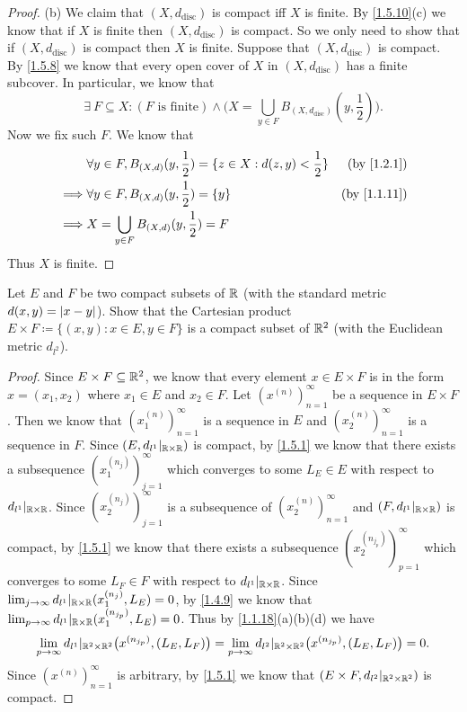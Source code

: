 \begin{proof}{(b)}
  We claim that \((X, d_{\text{disc}})\) is compact iff \(X\) is finite.
  By \cref{1.5.10}(c) we know that if \(X\) is finite then \((X, d_{\text{disc}})\) is compact.
  So we only need to show that if \((X, d_{\text{disc}})\) is compact then \(X\) is finite.
  Suppose that \((X, d_{\text{disc}})\) is compact.
  By \cref{1.5.8} we know that every open cover of \(X\) in \((X, d_{\text{disc}})\) has a finite subcover.
  In particular, we know that
  \[
    \exists\ F \subseteq X : (F \text{ is finite}) \land \bigg(X = \bigcup_{y \in F} B_{(X, d_{\text{disc}})}(y, \frac{1}{2})\bigg).
  \]
  Now we fix such \(F\).
  We know that
  \begin{align*}
             & \forall y \in F, B_{(X, d)}(y, \frac{1}{2}) = \{z \in X : d(z, y) < \frac{1}{2}\} & \text{(by \cref{1.2.1})}  \\
    \implies & \forall y \in F, B_{(X, d)}(y, \frac{1}{2}) = \{y\}                               & \text{(by \cref{1.1.11})} \\
    \implies & X = \bigcup_{y \in F} B_{(X, d)}(y, \frac{1}{2}) = F
  \end{align*}
  Thus \(X\) is finite.
\end{proof}

\begin{ex}\label{ex:1.5.13}
  Let \(E\) and \(F\) be two compact subsets of \(\mathbb{R}\) (with the standard metric \(d(x, y) = \left\lvert x - y\right\rvert\)).
  Show that the Cartesian product \(E \times F \coloneqq \{(x, y) : x \in E, y \in F\}\) is a compact subset of \(\mathbb{R}^2\) (with the Euclidean metric \(d_{l^2}\)).
\end{ex}

\begin{proof}
  Since \(E \times F \subseteq \mathbb{R}^2\), we know that every element \(x \in E \times F\) is in the form \(x = (x_1, x_2)\) where \(x_1 \in E\) and \(x_2 \in F\).
  Let \((x^{(n)})_{n = 1}^\infty\) be a sequence in \(E \times F\).
  Then we know that \((x_1^{(n)})_{n = 1}^\infty\) is a sequence in \(E\) and \((x_2^{(n)})_{n = 1}^\infty\) is a sequence in \(F\).
  Since \((E, d_{l^1}|_{\mathbb{R} \times \mathbb{R}})\) is compact, by \cref{1.5.1} we know that there exists a subsequence \((x_1^{(n_j)})_{j = 1}^\infty\) which converges to some \(L_E \in E\) with respect to \(d_{l^1}|_{\mathbb{R} \times \mathbb{R}}\).
  Since \((x_2^{(n_j)})_{j = 1}^\infty\) is a subsequence of \((x_2^{(n)})_{n = 1}^\infty\) and \((F, d_{l^1}|_{\mathbb{R} \times \mathbb{R}})\) is compact, by \cref{1.5.1} we know that there exists a subsequence \((x_2^{(n_{j_p})})_{p = 1}^\infty\) which converges to some \(L_F \in F\) with respect to \(d_{l^1}|_{\mathbb{R} \times \mathbb{R}}\).
  Since \(\lim_{j \to \infty} d_{l^1}|_{\mathbb{R} \times \mathbb{R}}(x_1^{(n_j)}, L_E) = 0\), by \cref{1.4.9} we know that \(\lim_{p \to \infty} d_{l^1}|_{\mathbb{R} \times \mathbb{R}}(x_1^{(n_{j_p})}, L_E) = 0\).
  Thus by \cref{1.1.18}(a)(b)(d) we have
  \[
    \lim_{p \to \infty} d_{l^1}|_{\mathbb{R}^2 \times \mathbb{R}^2}\big(x^{(n_{j_p})}, (L_E, L_F)\big) = \lim_{p \to \infty} d_{l^2}|_{\mathbb{R}^2 \times \mathbb{R}^2}\big(x^{(n_{j_p})}, (L_E, L_F)\big) = 0.
  \]
  Since \((x^{(n)})_{n = 1}^\infty\) is arbitrary, by \cref{1.5.1} we know that \((E \times F, d_{l^2}|_{\mathbb{R}^2 \times \mathbb{R}^2})\) is compact.
\end{proof}


